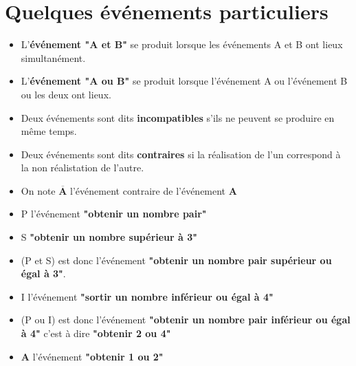 \section{Quelques événements particuliers}
\begin{definition}
    \begin{itemize}
        \item L'\textbf{événement "A et B"} se produit lorsque les événements A et B ont lieux simultanément.
        \item L'\textbf{événement "A ou B"} se produit lorsque l'événement A ou l'événement  B ou les deux ont lieux.
        \item Deux événements sont dits \textbf{incompatibles} s'ils ne peuvent se produire en même temps.
        \item Deux événements sont dits \textbf{contraires} si la réalisation de l'un correspond à la non réalistation de l'autre.
        \item On note $\mathbf{\overline{A}}$ l'événement contraire de l'événement $\mathbf{A}$
    \end{itemize}
\end{definition}

\begin{exemples*1}

    \begin{itemize}
        \item P l'événement \textbf{"obtenir un nombre pair"}
        \item S \textbf{"obtenir un nombre supérieur à 3"}
        \item (P et S) est donc l'événement \textbf{"obtenir un nombre pair supérieur ou égal à 3"}.
        \item I l'événement \textbf{"sortir un nombre inférieur ou égal à 4"}
        \item (P ou I) est donc l'événement \textbf{"obtenir un nombre pair inférieur ou égal à 4"} c'est à dire \textbf{"obtenir 2 ou 4"}  
        \item \textbf{A} l'événement \textbf{"obtenir 1 ou 2"}
    \end{itemize}
\end{exemples*1}
